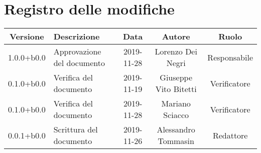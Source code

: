 \section*{Registro delle modifiche}

\begin{center}
	\begin{longtable}{|c|p{3cm}|c|c|c|}
	\hline
	\rowcolor{lighter-grayer}
	\textbf{Versione} & \textbf{Descrizione} & \textbf{Data} & \textbf{Autore} & \textbf{Ruolo} \\
	\hline
	\endfirsthead


	1.0.0+b0.0 & Approvazione del documento & 2019-11-28 & Lorenzo Dei Negri & Responsabile \\
	\hline
	0.1.0+b0.0 & Verifica del documento & 2019-11-19 & Giuseppe Vito Bitetti & Verificatore \\
	\hline
	0.1.0+b0.0 & Verifica del documento & 2019-11-28 & Mariano Sciacco & Verificatore \\
	\hline
	0.0.1+b0.0 & Scrittura del documento & 2019-11-26 & Alessandro Tommasin & Redattore \\

	\hline

	\end{longtable}
\end{center}
